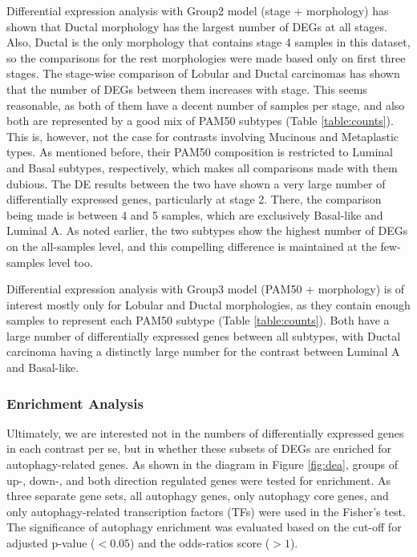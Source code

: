         Differential expression analysis with Group2 model (stage + morphology) has shown that Ductal morphology has the largest number of DEGs at all stages.  Also, Ductal is the only morphology that contains stage 4 samples in this dataset, so the comparisons for the rest morphologies were made based only on first three stages. The stage-wise comparison of Lobular and Ductal carcinomas has shown that the number of DEGs between them increases with stage. This seems reasonable, as both of them have a decent number of samples per stage, and also both are represented by a good mix of PAM50 subtypes (Table \ref{table:counts}). This is, however, not the case for contrasts involving Mucinous and Metaplastic types. As mentioned before, their PAM50 composition is restricted to Luminal and Basal subtypes, respectively, which makes all comparisons made with them dubious. The DE results between the two have shown a very large number of differentially expressed genes, particularly at stage 2. There, the comparison being made is between 4 and 5 samples, which are exclusively Basal-like and Luminal A. As noted earlier, the two subtypes show the highest number of DEGs on the all-samples level, and this compelling difference is maintained at the few-samples level too. 
        
        Differential expression analysis with Group3 model (PAM50 + morphology) is of interest mostly only for Lobular and Ductal morphologies, as they contain enough samples to represent each PAM50 subtype (Table \ref{table:counts}). Both have a large number of differentially expressed genes between all subtypes, with Ductal carcinoma having a distinctly large number for the contrast between Luminal A and Basal-like.  

        \subsubsection{Enrichment Analysis}
        
        Ultimately, we are interested not in the numbers of differentially expressed genes in each contrast per se, but in whether these subsets of DEGs are enriched for autophagy-related genes. As shown in the diagram in Figure \ref{fig:dea}, groups of up-, down-, and both direction regulated genes were tested for enrichment. As three separate gene sets, all autophagy genes, only autophagy core genes, and only autophagy-related transcription factors (TFs) were used in the Fisher’s test. The significance of autophagy enrichment was evaluated based on the cut-off for adjusted p-value ($<0.05$) and the odds-ratios score ($>1$). 

